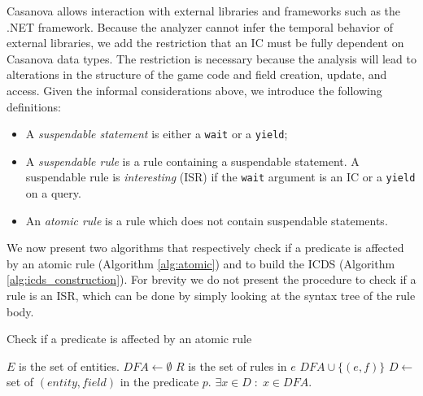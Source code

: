 Casanova allows interaction with external libraries and frameworks such as the .NET framework. Because the analyzer cannot infer the temporal behavior of external libraries, we add the restriction that an IC must be fully dependent on Casanova data types. The restriction is necessary because the analysis will lead to alterations in the structure of the game code and field creation, update, and access. Given the informal considerations above, we introduce the following definitions:
\begin{itemize}
\item A \textit{suspendable statement} is either a \texttt{wait} or a \texttt{yield};
\item A \textit{suspendable rule} is a rule containing a suspendable statement. A suspendable rule is \textit{interesting} (ISR) if the \texttt{wait} argument is an IC or a \texttt{yield} on a query.
\item An \textit{atomic rule} is a rule which does not contain suspendable statements.
\end{itemize}

We now present two algorithms that respectively check if a predicate is affected by an atomic rule (Algorithm \ref{alg:atomic}) and to build the ICDS (Algorithm \ref{alg:icds_construction}). For brevity we do not present the procedure to check if a rule is an ISR, which can be done by simply looking at the syntax tree of the rule body.


\begin{algorithm}
	
\caption{Check if a predicate is affected by an atomic rule}

\label{alg:atomic}
\begin{algorithmic}
\Statex
    \State $E$ is the set of entities.
\Statex    
    \State $DFA \gets \emptyset$
\Statex
\Statex    
        \State $R$ is the set of rules in $e$
\Statex        
        \Statex
            \Statex
                \Statex
                    \State $DFA \cup \lbrace (e,f) \rbrace$
                    \Statex
                \EndFor
                \Statex
            \EndIf
            \Statex
        \EndFor
        \Statex
    \EndFor
    \Statex
    \State $D \gets$ set of $(entity,field)$ in the predicate $p$.
    \Statex
    \State \Return $\exists x \in D \; : \; x \in DFA$.
    \Statex
\EndFunction
\end{algorithmic}
\end{algorithm}

